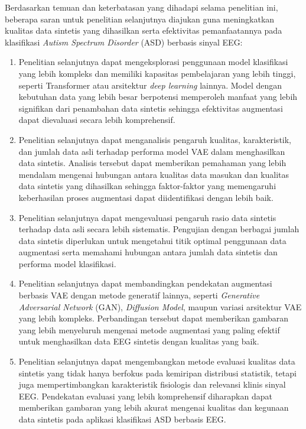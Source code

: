 Berdasarkan temuan dan keterbatasan yang dihadapi selama penelitian ini, beberapa saran untuk penelitian selanjutnya diajukan guna meningkatkan kualitas data sintetis yang dihasilkan serta efektivitas pemanfaatannya pada klasifikasi \textit{Autism Spectrum Disorder} (ASD) berbasis sinyal EEG:
\begin{enumerate}
    \item Penelitian selanjutnya dapat mengeksplorasi penggunaan model klasifikasi yang lebih kompleks dan memiliki kapasitas pembelajaran yang lebih tinggi, seperti Transformer atau arsitektur \textit{deep learning} lainnya. Model dengan kebutuhan data yang lebih besar berpotensi memperoleh manfaat yang lebih signifikan dari penambahan data sintetis sehingga efektivitas augmentasi dapat dievaluasi secara lebih komprehensif.

    \item Penelitian selanjutnya dapat menganalisis pengaruh kualitas, karakteristik, dan jumlah data asli terhadap performa model VAE dalam menghasilkan data sintetis. Analisis tersebut dapat memberikan pemahaman yang lebih mendalam mengenai hubungan antara kualitas data masukan dan kualitas data sintetis yang dihasilkan sehingga faktor-faktor yang memengaruhi keberhasilan proses augmentasi dapat diidentifikasi dengan lebih baik.

    \item Penelitian selanjutnya dapat mengevaluasi pengaruh rasio data sintetis terhadap data asli secara lebih sistematis. Pengujian dengan berbagai jumlah data sintetis diperlukan untuk mengetahui titik optimal penggunaan data augmentasi serta memahami hubungan antara jumlah data sintetis dan performa model klasifikasi.

    \item Penelitian selanjutnya dapat membandingkan pendekatan augmentasi berbasis VAE dengan metode generatif lainnya, seperti \textit{Generative Adversarial Network} (GAN), \textit{Diffusion Model}, maupun variasi arsitektur VAE yang lebih kompleks. Perbandingan tersebut dapat memberikan gambaran yang lebih menyeluruh mengenai metode augmentasi yang paling efektif untuk menghasilkan data EEG sintetis dengan kualitas yang baik.

    \item Penelitian selanjutnya dapat mengembangkan metode evaluasi kualitas data sintetis yang tidak hanya berfokus pada kemiripan distribusi statistik, tetapi juga mempertimbangkan karakteristik fisiologis dan relevansi klinis sinyal EEG. Pendekatan evaluasi yang lebih komprehensif diharapkan dapat memberikan gambaran yang lebih akurat mengenai kualitas dan kegunaan data sintetis pada aplikasi klasifikasi ASD berbasis EEG.
\end{enumerate}